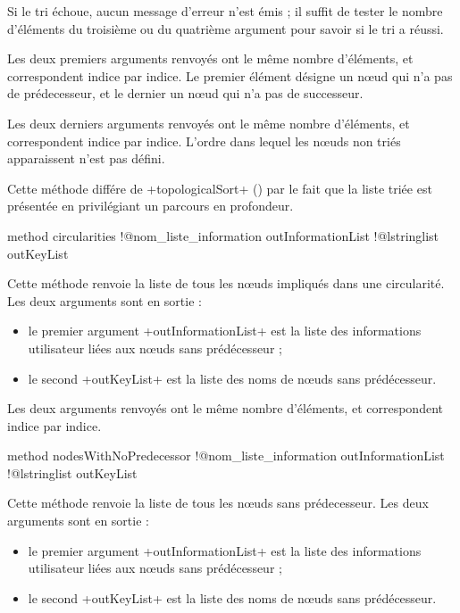 Si le tri échoue, aucun message d'erreur n'est émis ; il suffit de tester le nombre d'éléments du troisième ou du quatrième argument pour savoir si le tri a réussi.

Les deux premiers arguments renvoyés ont le même nombre d'éléments, et correspondent indice par indice. Le premier élément désigne un nœud qui n'a pas de prédecesseur, et le dernier un nœud qui n'a pas de successeur.


Les deux derniers arguments renvoyés ont le même nombre d'éléments, et correspondent indice par indice. L'ordre dans lequel les nœuds non triés apparaissent n'est pas défini.

Cette méthode différe de \ggs+topologicalSort+ () par le fait que la liste triée est présentée en privilégiant un parcours en profondeur.







\begin{galgas}
method circularities
  !@nom_liste_information outInformationList
  !@lstringlist outKeyList
\end{galgas}

Cette méthode renvoie la liste de tous les nœuds impliqués dans une circularité. Les deux arguments sont en sortie :
\begin{itemize}
  \item le premier argument \ggs+outInformationList+ est la liste des informations utilisateur liées aux nœuds sans prédécesseur ;
  \item le second \ggs+outKeyList+ est la liste des noms de nœuds sans prédécesseur.
\end{itemize}

Les deux arguments renvoyés ont le même nombre d'éléments, et correspondent indice par indice.







\begin{galgas}
method nodesWithNoPredecessor
  !@nom_liste_information outInformationList
  !@lstringlist outKeyList
\end{galgas}

Cette méthode renvoie la liste de tous les nœuds sans prédecesseur. Les deux arguments sont en sortie :
\begin{itemize}
  \item le premier argument \ggs+outInformationList+ est la liste des informations utilisateur liées aux nœuds sans prédécesseur ;
  \item le second \ggs+outKeyList+ est la liste des noms de nœuds sans prédécesseur.
\end{itemize}

